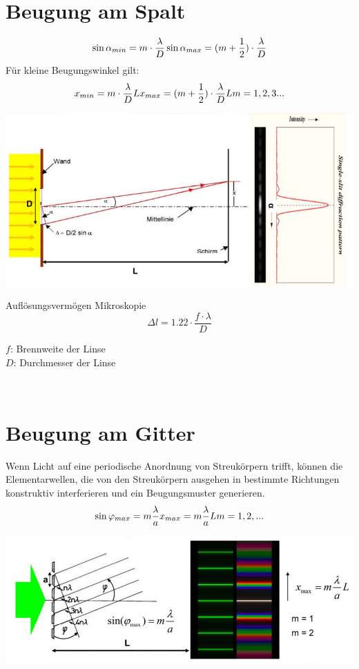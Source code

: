 \section{Beugung am Spalt}
\[
	\sin\alpha_{min}=m\cdot \frac{\lambda}{D} \\
	\sin\alpha_{max}=(m+\frac{1}{2})\cdot \frac{\lambda}{D}	
\]
Für kleine Beugungswinkel gilt:
\[
	x_{min}=m\cdot\frac{\lambda}{D}L\\
	x_{max}=(m+\frac{1}{2})\cdot\frac{\lambda}{D}L\\ \\
	m=1,2,3...
\]
\begin{center}
	\includegraphics[scale = 0.3]{images/beugung_spalt.jpg}
\end{center}
Auflösungsvermögen Mikroskopie
\[
	\Delta l=1.22 \cdot \frac{f\cdot\lambda}{D}
\]
\begin{footnotesize}
	$f$:	Brennweite der Linse \\
	$D$:	Durchmesser der Linse\\
\end{footnotesize}
\\
\section{Beugung am Gitter}
Wenn Licht auf eine periodische Anordnung von Streukörpern trifft, können die Elementarwellen, die von den Streukörpern ausgehen in bestimmte Richtungen konstruktiv interferieren und ein Beugungsmuster generieren.
\[
	\sin \varphi_{max}=m\frac{\lambda}{a} \\
	x_{max}=m\frac{\lambda}{a}L \\
	m=1,2,...
\]
\begin{center}
	\includegraphics[scale = 0.25]{images/beugung_gitter.jpg}
\end{center}
\
